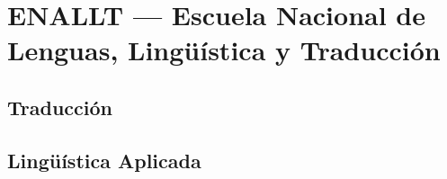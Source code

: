 \section{ENALLT --- Escuela Nacional de Lenguas, Lingüística y Traducción}

\subsection{Traducción}

\subsection{Lingüística Aplicada}
